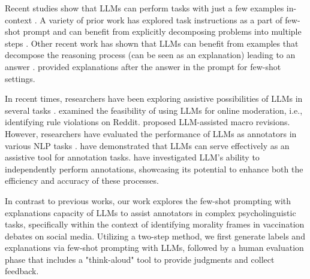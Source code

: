 Recent studies show that LLMs can perform tasks with just a few examples in-context \cite{chowdhery2023palm,le2022bloom,kojima2022large,brown2020language}. A variety of prior work has
explored task instructions as a part of few-shot prompt \cite{mishra2022cross} and can benefit from explicitly decomposing problems into multiple steps \cite{mishra2022reframing}. Other recent work has shown that LLMs can benefit from examples that decompose the reasoning process (can be seen as an explanation) leading to an answer \cite{wei2022chain}. \citet{lampinen2022can} provided explanations after the answer in the prompt for few-shot settings. 


In recent times, researchers have been exploring assistive possibilities of LLMs in several tasks \cite{kolla2024llm,lin2024rambler,xu2024jamplate,kim2024exploring}. \citet{kolla2024llm} examined the feasibility of using LLMs for online moderation, i.e.,
identifying rule violations on Reddit. \citet{lin2024rambler} proposed LLM-assisted macro revisions. However, researchers have evaluated the performance of LLMs as annotators in various NLP tasks \cite{ding2023gpt,wang2021want}. \citet{mei2024wavcaps} have demonstrated that LLMs can serve effectively as an assistive tool for annotation tasks. \citet{gilardi2023chatgpt,huang2023chatgpt} have investigated LLM's ability to independently perform annotations, showcasing its potential to enhance both the efficiency and accuracy of these processes. 

In contrast to previous works, our work explores the few-shot prompting with explanations capacity of LLMs to assist annotators in complex psycholinguistic tasks, specifically within the context of identifying morality frames in vaccination debates on social media. Utilizing a two-step method, we first generate labels and explanations via few-shot prompting with LLMs, followed by a human evaluation phase that includes a "think-aloud" tool to provide judgments and collect feedback. 

